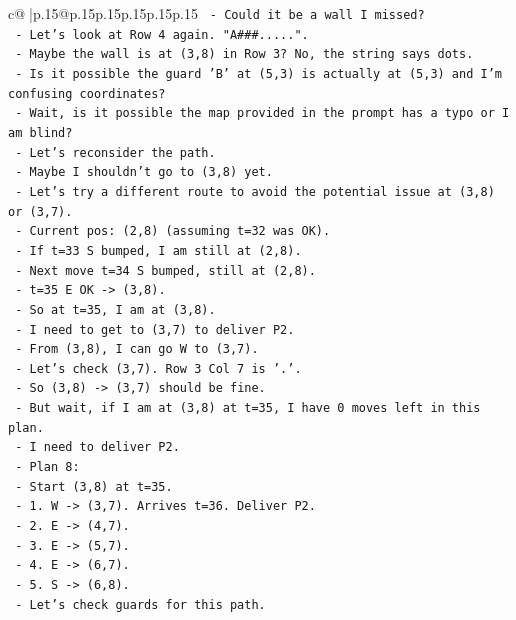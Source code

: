 \documentclass{article}
\begin{document}
{\begin{supertabular}{c@{$\;$}|p{.15\linewidth}@{}p{.15\linewidth}p{.15\linewidth}p{.15\linewidth}p{.15\linewidth}p{.15\linewidth}}
{{{\texttt{  {-} Could it be a wall I missed?} \\
\texttt{  {-} Let's look at Row 4 again. "A\#\#\#.....".} \\
\texttt{  {-} Maybe the wall is at (3,8) in Row 3? No, the string says dots.} \\
\texttt{  {-} Is it possible the guard 'B' at (5,3) is actually at (5,3) and I'm confusing coordinates?} \\
\texttt{  {-} Wait, is it possible the map provided in the prompt has a typo or I am blind?} \\
\texttt{  {-} Let's reconsider the path.} \\
\texttt{  {-} Maybe I shouldn't go to (3,8) yet.} \\
\texttt{  {-} Let's try a different route to avoid the potential issue at (3,8) or (3,7).} \\
\texttt{  {-} Current pos: (2,8) (assuming t=32 was OK).} \\
\texttt{  {-} If t=33 S bumped, I am still at (2,8).} \\
\texttt{  {-} Next move t=34 S bumped, still at (2,8).} \\
\texttt{  {-} t=35 E OK {-}> (3,8).} \\
\texttt{  {-} So at t=35, I am at (3,8).} \\
\texttt{  {-} I need to get to (3,7) to deliver P2.} \\
\texttt{  {-} From (3,8), I can go W to (3,7).} \\
\texttt{  {-} Let's check (3,7). Row 3 Col 7 is '.'.} \\
\texttt{  {-} So (3,8) {-}> (3,7) should be fine.} \\
\texttt{  {-} But wait, if I am at (3,8) at t=35, I have 0 moves left in this plan.} \\
\texttt{  {-} I need to deliver P2.} \\
\texttt{  {-} Plan 8:} \\
\texttt{    {-} Start (3,8) at t=35.} \\
\texttt{    {-} 1. W {-}> (3,7). Arrives t=36. Deliver P2.} \\
\texttt{    {-} 2. E {-}> (4,7).} \\
\texttt{    {-} 3. E {-}> (5,7).} \\
\texttt{    {-} 4. E {-}> (6,7).} \\
\texttt{    {-} 5. S {-}> (6,8).} \\
\texttt{  {-} Let's check guards for this path.} \\
}}}
\end{supertabular}}
\end{document}
